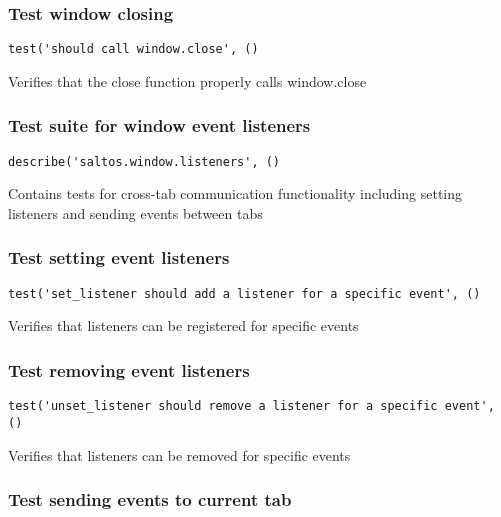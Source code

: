 \documentclass[a4paper]{article}
\begin{document}
\hypertarget{toc292}{}
\subsubsection{Test window closing}

\begin{lstlisting}
test('should call window.close', ()
\end{lstlisting}

Verifies that the close function properly calls window.close

\hypertarget{toc293}{}
\subsubsection{Test suite for window event listeners}

\begin{lstlisting}
describe('saltos.window.listeners', ()
\end{lstlisting}

Contains tests for cross-tab communication functionality
including setting listeners and sending events between tabs

\hypertarget{toc294}{}
\subsubsection{Test setting event listeners}

\begin{lstlisting}
test('set_listener should add a listener for a specific event', ()
\end{lstlisting}

Verifies that listeners can be registered for specific events

\hypertarget{toc295}{}
\subsubsection{Test removing event listeners}

\begin{lstlisting}
test('unset_listener should remove a listener for a specific event', ()
\end{lstlisting}

Verifies that listeners can be removed for specific events

\hypertarget{toc296}{}
\subsubsection{Test sending events to current tab}
\end{document}
